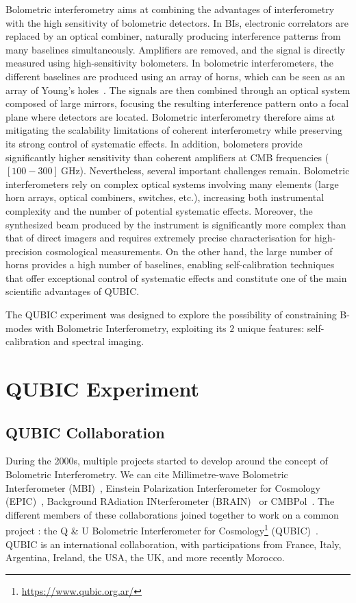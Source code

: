 \documentclass[../../thesis.tex]{subfiles}
\begin{document}
Bolometric interferometry aims at combining the advantages of interferometry with the high sensitivity of bolometric detectors. In BIs, electronic correlators are replaced by an optical combiner, naturally producing interference patterns from many baselines simultaneously. Amplifiers are removed, and the signal is directly measured using high-sensitivity bolometers. In bolometric interferometers, the different baselines are produced using an array of horns, which can be seen as an array of Young's holes~\cite{young1804}. The signals are then combined through an optical system composed of large mirrors, focusing the resulting interference pattern onto a focal plane where detectors are located. Bolometric interferometry therefore aims at mitigating the scalability limitations of coherent interferometry while preserving its strong control of systematic effects. In addition, bolometers provide significantly higher sensitivity than coherent amplifiers at CMB frequencies ($[100 - 300]~\mathrm{GHz}$). 
Nevertheless, several important challenges remain. Bolometric interferometers rely on complex optical systems involving many elements (large horn arrays, optical combiners, switches, etc.), increasing both instrumental complexity and the number of potential systematic effects. Moreover, the synthesized beam produced by the instrument is significantly more complex than that of direct imagers and requires extremely precise characterisation for high-precision cosmological measurements. On the other hand, the large number of horns provides a high number of baselines, enabling self-calibration techniques that offer exceptional control of systematic effects and constitute one of the main scientific advantages of QUBIC.

The QUBIC experiment was designed to explore the possibility of constraining B-modes with Bolometric Interferometry, exploiting its $2$ unique features: self-calibration and spectral imaging.

\section{QUBIC Experiment}

\subsection{QUBIC Collaboration}

During the 2000s, multiple projects started to develop around the concept of Bolometric Interferometry. We can cite Millimetre-wave Bolometric Interferometer (MBI)~\cite{MBI2002, MBI2003}, Einstein Polarization Interferometer for Cosmology (EPIC)~\cite{EPIC}, Background RAdiation INterferometer (BRAIN)~\cite{BRAIN} or CMBPol~\cite{CMBPol}. The different members of these collaborations joined together to work on a common project : the Q \& U Bolometric Interferometer for Cosmology\footnote{\url{https://www.qubic.org.ar/}} (QUBIC)~\cite{preQUBICI,ghribiPhD,preQUBICII,preQUBICIII, QUBICI}. QUBIC is an international collaboration, with participations from France, Italy, Argentina, Ireland, the USA, the UK, and more recently Morocco. 
\end{document}
